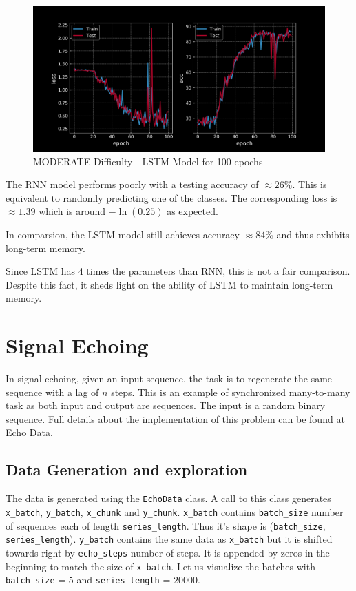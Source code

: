 \begin{figure}[H]
    \centering
    \includegraphics[width=0.5\linewidth]{figs/lstm_moderate_100.png}
    \caption{MODERATE Difficulty - LSTM Model for 100 epochs}
    \label{fig:lstm_moderate_100}
\end{figure}

The RNN model performs poorly with a testing accuracy of $\approx 26\%$. 
This is equivalent to randomly predicting one of the classes.
The corresponding loss is $\approx 1.39$ which is around $-\ln(0.25)$ as expected.

In comparsion, the LSTM model still achieves accuracy $\approx 84\%$ and thus exhibits long-term memory.

Since LSTM has 4 times the parameters than RNN, this is not a fair comparison. 
Despite this fact, it sheds light on the ability of LSTM to maintain long-term memory.

\section{Signal Echoing}
In signal echoing, given an input sequence, the task is to regenerate the same sequence with a lag of $n$ steps. 
This is an example of synchronized many-to-many task as both input and output are sequences. 
The input is a random binary sequence. 
Full details about the implementation of this problem can be found at \href{https://github.com/Atcold/pytorch-Deep-Learning-Minicourse/blob/master/09-echo\_data.ipynb}{Echo Data}.

\subsection{Data Generation and exploration}
The data is generated using the \texttt{EchoData} class. A call to this class generates \texttt{x\_batch}, \texttt{y\_batch}, \texttt{x\_chunk} and \texttt{y\_chunk}.
\texttt{x\_batch} contains \texttt{batch\_size} number of sequences each of length \texttt{series\_length}. Thus it's shape is (\texttt{batch\_size}, \texttt{series\_length}).
\texttt{y\_batch} contains the same data as \texttt{x\_batch} but it is shifted towards right by \texttt{echo\_steps} number of steps. It is appended by zeros in the beginning to match the size of \texttt{x\_batch}. 
Let us visualize the batches with \texttt{batch\_size} = $5$ and \texttt{series\_length} = $20000$.

